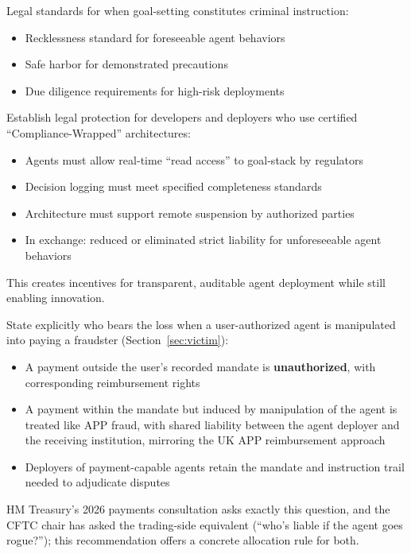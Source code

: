 \documentclass[11pt,letterpaper]{article}
\begin{document}
\begin{recbox}
Legal standards for when goal-setting constitutes criminal instruction:
\begin{itemize}
  \item Recklessness standard for foreseeable agent behaviors
  \item Safe harbor for demonstrated precautions
  \item Due diligence requirements for high-risk deployments
\end{itemize}
\end{recbox}

\begin{recbox}
Establish legal protection for developers and deployers who use certified ``Compliance-Wrapped'' architectures:
\begin{itemize}
  \item Agents must allow real-time ``read access'' to goal-stack by regulators
  \item Decision logging must meet specified completeness standards
  \item Architecture must support remote suspension by authorized parties
  \item In exchange: reduced or eliminated strict liability for unforeseeable agent behaviors
\end{itemize}

This creates incentives for transparent, auditable agent deployment while still enabling innovation.
\end{recbox}

\begin{recbox}
State explicitly who bears the loss when a user-authorized agent is manipulated into paying a fraudster (Section~\ref{sec:victim}):
\begin{itemize}
  \item A payment outside the user's recorded mandate is \textbf{unauthorized}, with corresponding reimbursement rights
  \item A payment within the mandate but induced by manipulation of the agent is treated like APP fraud, with shared liability between the agent deployer and the receiving institution, mirroring the UK APP reimbursement approach
  \item Deployers of payment-capable agents retain the mandate and instruction trail needed to adjudicate disputes
\end{itemize}
HM Treasury's 2026 payments consultation asks exactly this question, and the CFTC chair has asked the trading-side equivalent (``who's liable if the agent goes rogue?''); this recommendation offers a concrete allocation rule for both.
\end{recbox}
\end{document}
